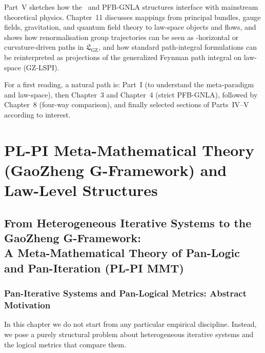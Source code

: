 \documentclass[11pt]{book}
\theoremstyle{plain}
\theoremstyle{definition}
\newcommand{\GFramework}{\text{G-Framework}} \newcommand{\GAlgebra}{\text{G-Algebra}}
\newcommand{\GZLS}{\ensuremath{\mathfrak{L}_{\mathrm{GZ}}}}       \newcommand{\GZLT}{\ensuremath{M_{!w}}}                           \newcommand{\GZLOC}{\ensuremath{A_M}}                             \newcommand{\GZLCurv}{\ensuremath{\mathcal{F}_{\mathrm{law}}}}
\begin{document}
Part~V sketches how the \GFramework\ and PFB-GNLA structures interface
with mainstream theoretical physics. Chapter~11 discusses mappings from
principal bundles, gauge fields, gravitation, and quantum field theory
to law-space objects and flows, and shows how renormalisation group
trajectories can be seen as \GZTLC-horizontal or curvature-driven paths
in \GZLS, and how standard path-integral formulations can be
reinterpreted as projections of the generalized Feynman path integral
on law-space (GZ-LSPI).



\medskip

For a first reading, a natural path is:
Part~I (to understand the meta-paradigm and law-space),
then Chapter~3 and Chapter~4 (strict PFB-GNLA),
followed by Chapter~8 (four-way comparison), and finally selected
sections of Parts~IV–V according to interest.







\tableofcontents

\mainmatter



\part{PL-PI Meta-Mathematical Theory (GaoZheng G-Framework) and Law-Level Structures}


\chapter[Pan-Iterative Systems and Pan-Logical Metrics]{From Heterogeneous Iterative Systems to the GaoZheng G-Framework:\\
         A Meta-Mathematical Theory of Pan-Logic and Pan-Iteration (PL-PI MMT)}


\section{Pan-Iterative Systems and Pan-Logical Metrics: Abstract Motivation}
\label{sec:pan-iter-motivation}


In this chapter we do not start from any particular empirical
discipline. Instead, we pose a purely structural problem about
heterogeneous iterative systems and the logical metrics that compare
them.
\end{document}
